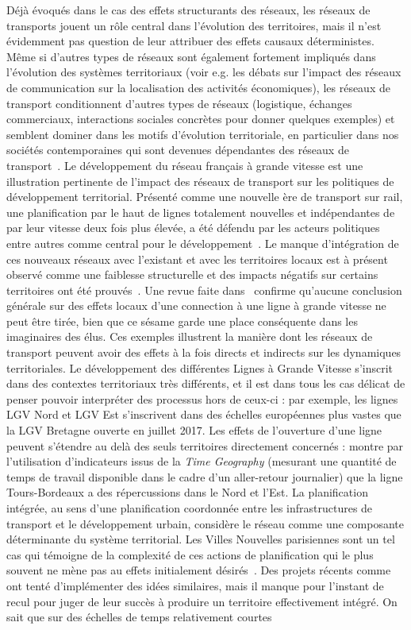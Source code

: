 {}{
Déjà évoqués dans le cas des effets structurants des réseaux, les réseaux de transports jouent un rôle central dans l'évolution des territoires, mais il n'est évidemment pas question de leur attribuer des effets causaux déterministes. Même si d'autres types de réseaux sont également fortement impliqués dans l'évolution des systèmes territoriaux (voir e.g. les débats sur l'impact des réseaux de communication sur la localisation des activités économiques), les réseaux de transport conditionnent d'autres types de réseaux (logistique, échanges commerciaux, interactions sociales concrètes pour donner quelques exemples) et semblent dominer dans les motifs d'évolution territoriale, en particulier dans nos sociétés contemporaines qui sont devenues dépendantes des réseaux de transport~\cite{bavoux2005geographie}. Le développement du réseau français à grande vitesse est une illustration pertinente de l'impact des réseaux de transport sur les politiques de développement territorial. Présenté comme une nouvelle ère de transport sur rail, une planification par le haut de lignes totalement nouvelles et indépendantes de par leur vitesse deux fois plus élevée, a été défendu par les acteurs politiques entre autres comme central pour le développement~\cite{zembri1997fondements}. Le manque d'intégration de ces nouveaux réseaux avec l'existant et avec les territoires locaux est à présent observé comme une faiblesse structurelle et des impacts négatifs sur certains territoires ont été prouvés~\cite{zembri2008contribution}. Une revue faite dans~\cite{bazin2011grande} confirme qu'aucune conclusion générale sur des effets locaux d'une connection à une ligne à grande vitesse ne peut être tirée, bien que ce sésame garde une place conséquente dans les imaginaires des élus. Ces exemples illustrent la manière dont les réseaux de transport peuvent avoir des effets à la fois directs et indirects sur les dynamiques territoriales. Le développement des différentes Lignes à Grande Vitesse s'inscrit dans des contextes territoriaux très différents, et il est dans tous les cas délicat de penser pouvoir interpréter des processus hors de ceux-ci : par exemple, les lignes LGV Nord et LGV Est s'inscrivent dans des échelles européennes plus vastes que la LGV Bretagne ouverte en juillet 2017. Les effets de l'ouverture d'une ligne peuvent s'étendre au delà des seuls territoires directement concernés : \cite{l2014contribution} montre par l'utilisation d'indicateurs issus de la \emph{Time Geography} (mesurant une quantité de temps de travail disponible dans le cadre d'un aller-retour journalier) que la ligne Tours-Bordeaux a des répercussions dans le Nord et l'Est. La planification intégrée, au sens d'une planification coordonnée entre les infrastructures de transport et le développement urbain, considère le réseau comme une composante déterminante du système territorial. Les Villes Nouvelles parisiennes sont un tel cas qui témoigne de la complexité de ces actions de planification qui le plus souvent ne mène pas au effets initialement désirés~\cite{es119}. Des projets récents comme~\cite{l2012ville} ont tenté d'implémenter des idées similaires, mais il manque pour l'instant de recul pour juger de leur succès à produire un territoire effectivement intégré. On sait que sur des échelles de temps relativement courtes }
